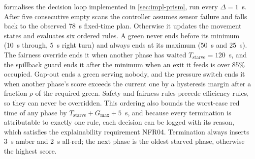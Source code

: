  formalises the decision loop implemented in \cref{sec:impl-prism}, run every $\Delta=1$~s. After five consecutive empty scans the controller assumes sensor failure and falls back to the observed 78~s fixed-time plan. Otherwise it updates the movement states and evaluates six ordered rules. A green never ends before its minimum (10~s through, 5~s right turn) and always ends at its maximum (50~s and 25~s). The fairness override ends it when another phase has waited $T_{\mathrm{starve}}=120$~s, and the spillback guard ends it after the minimum when an exit it feeds is over 85\% occupied. Gap-out ends a green serving nobody, and the pressure switch ends it when another phase's score exceeds the current one by a hysteresis margin after a fraction $\rho$ of the required green. Safety and fairness rules precede efficiency rules, so they can never be overridden. This ordering also bounds the worst-case red time of any phase by $T_{\mathrm{starve}}+G_{\max}+5$~s, and because every termination is attributable to exactly one rule, each decision can be logged with its reason, which satisfies the explainability requirement NFR04. Termination always inserts 3~s amber and 2~s all-red; the next phase is the oldest starved phase, otherwise the highest score.

